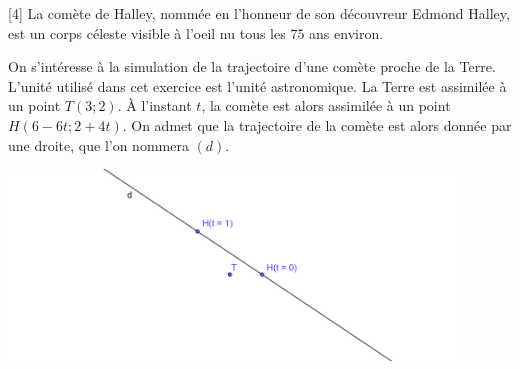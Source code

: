 \documentclass{exam}
\begin{document}
\begin{questions}
\vspace*{1cm}
[4]
La comète de Halley, nommée en l'honneur de son découvreur Edmond Halley, est un corps céleste visible à l'oeil nu tous les $75$ ans environ.

On s'intéresse à la simulation de la trajectoire d'une comète proche de la Terre. L'unité utilisé dans cet exercice est l'unité astronomique. La Terre est assimilée à un point $T(3;2)$. À l'instant $t$, la comète est alors assimilée à un point $H(6-6t;2+4t)$. On admet que la trajectoire de la comète est alors donnée par une droite, que l'on nommera $(d)$.
\begin{center}
\includegraphics[width=0.9\textwidth]{Controle2.png}
\end{center}
\end{questions}
\end{document}
